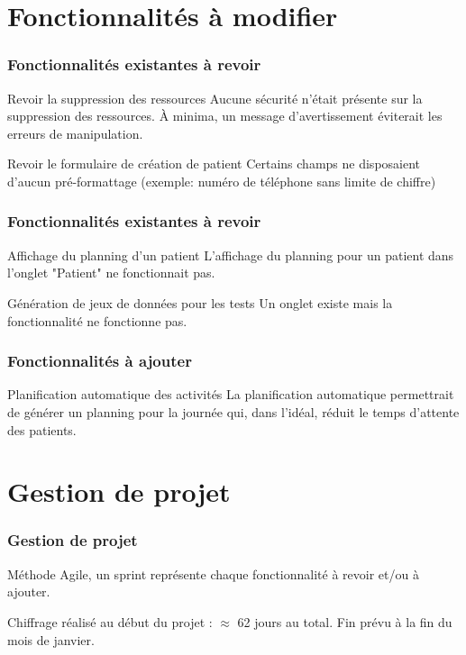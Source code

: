 \documentclass{beamer}
\begin{document}
\section[Fonctionnalités]{Fonctionnalités à modifier}

\begin{frame}
\frametitle{Fonctionnalités existantes à revoir}

\begin{block}{Revoir la suppression des ressources}
	Aucune sécurité n'était présente sur la suppression des ressources. À minima, un message d'avertissement éviterait les erreurs de manipulation.
\end{block}	

\begin{block}{Revoir le formulaire de création de patient}
	Certains champs ne disposaient d'aucun pré-formattage (exemple: numéro de téléphone sans limite de chiffre)
\end{block}
	
\end{frame}


\begin{frame}
\frametitle{Fonctionnalités existantes à revoir}

\begin{block}{Affichage du planning d'un patient}
	L'affichage du planning pour un patient dans l'onglet "Patient" ne fonctionnait pas.
\end{block}

\begin{block}{Génération de jeux de données pour les tests}
	Un onglet existe mais la fonctionnalité ne fonctionne pas.
\end{block}

\end{frame}


\begin{frame}
\frametitle{Fonctionnalités à ajouter}

\begin{block}{Planification automatique des activités}
	La planification automatique permettrait de générer un planning pour la journée qui, dans l'idéal, réduit le temps d'attente des patients.
\end{block}	

\end{frame}

\section[Gestion de projet]{Gestion de projet}
\begin{frame}
\frametitle{Gestion de projet}

Méthode Agile, un sprint représente chaque fonctionnalité à revoir et/ou à ajouter. 

Chiffrage réalisé au début du projet : $\approx$ 62 jours au total. Fin prévu à la fin du mois de janvier.

\end{frame}
\end{document}

